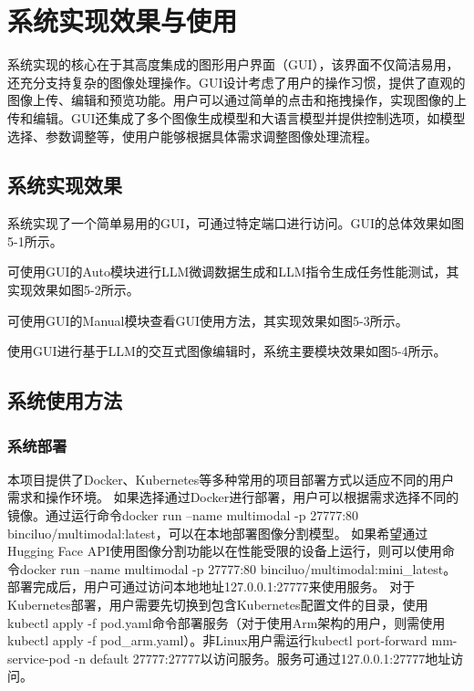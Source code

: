 \documentclass[a4paper,AutoFakeBold,oneside,12pt]{book}
\begin{document}
\chapter{系统实现效果与使用} %
系统实现的核心在于其高度集成的图形用户界面（GUI），该界面不仅简洁易用，还充分支持复杂的图像处理操作。GUI设计考虑了用户的操作习惯，提供了直观的图像上传、编辑和预览功能。用户可以通过简单的点击和拖拽操作，实现图像的上传和编辑。GUI还集成了多个图像生成模型和大语言模型并提供控制选项，如模型选择、参数调整等，使用户能够根据具体需求调整图像处理流程。
\section{系统实现效果}
系统实现了一个简单易用的GUI，可通过特定端口进行访问。GUI的总体效果如图5-1所示。

可使用GUI的Auto模块进行LLM微调数据生成和LLM指令生成任务性能测试，其实现效果如图5-2所示。

可使用GUI的Manual模块查看GUI使用方法，其实现效果如图5-3所示。

使用GUI进行基于LLM的交互式图像编辑时，系统主要模块效果如图5-4所示。

\section{系统使用方法}
\subsection{系统部署}
本项目提供了Docker、Kubernetes等多种常用的项目部署方式以适应不同的用户需求和操作环境。
如果选择通过Docker进行部署，用户可以根据需求选择不同的镜像。通过运行命令docker run --name multimodal -p 27777:80 binciluo/multimodal:latest，可以在本地部署图像分割模型。
如果希望通过Hugging Face API使用图像分割功能以在性能受限的设备上运行，则可以使用命令docker run --name multimodal -p 27777:80 binciluo/multimodal:mini\_latest。
部署完成后，用户可通过访问本地地址127.0.0.1:27777来使用服务。
对于Kubernetes部署，用户需要先切换到包含Kubernetes配置文件的目录，使用kubectl apply -f pod.yaml命令部署服务（对于使用Arm架构的用户，则需使用kubectl apply -f pod\_arm.yaml）。非Linux用户需运行kubectl port-forward mm-service-pod -n default 27777:27777以访问服务。服务可通过127.0.0.1:27777地址访问。
\end{document}

